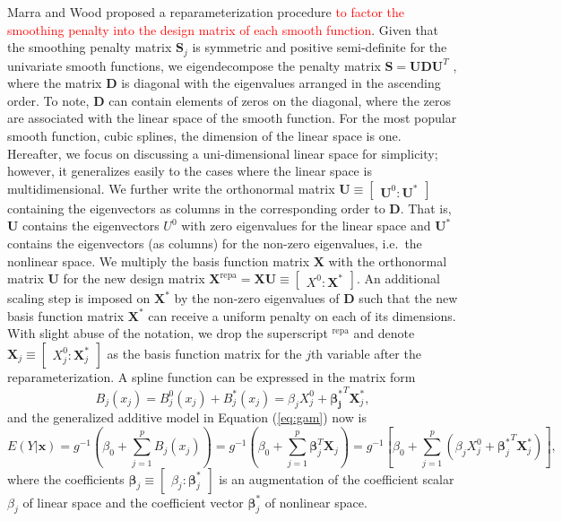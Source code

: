\documentclass[AMA,STIX1COL,]{WileyNJD-v2}
\begin{document}
Marra and Wood \citep{Marra2011} proposed a reparameterization procedure
\textcolor{red}{to factor the smoothing penalty into the design matrix of each smooth function}.
Given that the smoothing penalty matrix \(\boldsymbol{S}_j\) is
symmetric and positive semi-definite for the univariate smooth
functions, we eigendecompose the penalty matrix
\(\boldsymbol{S} = \boldsymbol{U} \boldsymbol{D} \boldsymbol{U}^T\) ,
where the matrix \(\boldsymbol{D}\) is diagonal with the eigenvalues
arranged in the ascending order. To note, \(\boldsymbol{D}\) can contain
elements of zeros on the diagonal, where the zeros are associated with
the linear space of the smooth function. For the most popular smooth
function, cubic splines, the dimension of the linear space is one.
Hereafter, we focus on discussing a uni-dimensional linear space for
simplicity; however, it generalizes easily to the cases where the linear
space is multidimensional. We further write the orthonormal matrix
\(\boldsymbol{U} \equiv \begin{bmatrix} \boldsymbol{U}^0 : \boldsymbol{U}^{*}\end{bmatrix}\)
containing the eigenvectors as columns in the corresponding order to
\(\boldsymbol{D}\). That is, \(\boldsymbol{U}\) contains the
eigenvectors \(U^0\) with zero eigenvalues for the linear space and
\(\boldsymbol{U}^{*}\) contains the eigenvectors (as columns) for the
non-zero eigenvalues, i.e.~the nonlinear space. We multiply the basis
function matrix \(\boldsymbol{X}\) with the orthonormal matrix
\(\boldsymbol{U}\) for the new design matrix
\({\boldsymbol{X}}^\text{repa}= \boldsymbol{X} \boldsymbol{U} \equiv \begin{bmatrix} X^0 : \boldsymbol{X}^{*} \end{bmatrix}\).
An additional scaling step is imposed on \(\boldsymbol{X}^{*}\) by the
non-zero eigenvalues of \(\boldsymbol{D}\) such that the new basis
function matrix \(\boldsymbol{X}^\ast\) can receive a uniform penalty on
each of its dimensions. With slight abuse of the notation, we drop the
superscript \(^\text{repa}\) and denote
\(\boldsymbol{X}_j \equiv \begin{bmatrix} X_j^0 : \boldsymbol{X}_j^{*} \end{bmatrix}\)
as the basis function matrix for the \(j\)th variable after the
reparameterization. A spline function can be expressed in the matrix
form \[
B_j(x_j) = B_j^0(x_j) + B_j^*(x_j) = \beta_j X^0_j + \boldsymbol{\beta_j^*}^T \boldsymbol{X}_j^*,
\] and the generalized additive model in Equation (\ref{eq:gam}) now is
\begin{equation}\label{eq:gam-repa}
E(Y|\boldsymbol{x}) = g^{-1}(\beta_0 + \sum\limits^p_{j=1} B_j(x_j)) = g^{-1}(\beta_0 + \sum\limits^p_{j=1} \boldsymbol{\beta}_j^T \boldsymbol{X}_j) = g^{-1}\left[\beta_0 + \sum\limits^p_{j=1} (\beta_j X^0_j + {\boldsymbol{\beta}_j^*}^T \boldsymbol{X}_j^*)\right],
\end{equation} where the coefficients
\(\boldsymbol{\beta}_j \equiv \begin{bmatrix} \beta_j : \boldsymbol{\beta}^*_j \end{bmatrix}\)
is an augmentation of the coefficient scalar \(\beta_j\) of linear space
and the coefficient vector \(\boldsymbol{\beta}^*_j\) of nonlinear
space.
\end{document}

